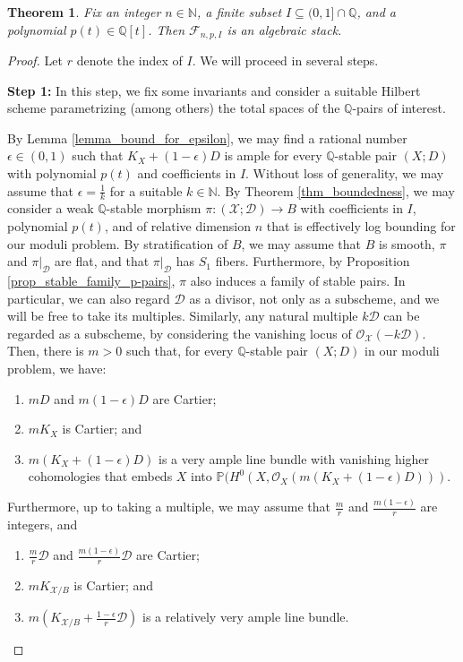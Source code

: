 \documentclass{amsart}
\newcommand{\bP}{\mathbb{P}}
\newcommand{\bQ}{\mathbb{Q}}
\newcommand{\sF}{\mathscr{F}}
\newcommand{\cD}{\mathcal{D}}
\newcommand{\cO}{\mathcal{O}}
\newcommand{\cX}{\mathcal{X}}
\newtheorem{theorem}{Theorem}[section]
\theoremstyle{definition}
\def\O#1.{\mathcal {O}_{#1}}
\newcommand{\nn}{\mathbb{N}}
\begin{document}
\begin{theorem}
Fix an integer $n\in \mathbb{N}$, a finite subset $I\subseteq (0,1] \cap \mathbb{Q}$, and a polynomial $p(t) \in \mathbb{Q}[t]$. Then $\sF_{n,p,I}$ is an algebraic stack.
\end{theorem}

\begin{proof}Let $r$ denote the index of $I$.
We will proceed in several steps.


{\bf Step 1:} In this step, we fix some invariants and consider a suitable Hilbert scheme parametrizing (among others) the total spaces of the $\bQ$-pairs of interest.

By Lemma \ref{lemma_bound_for_epsilon}, we may find a rational number $\epsilon \in (0,1)$ such that $K_X+(1-\epsilon)D$ is ample for every $\bQ$-stable pair $(X;D)$ with polynomial $p(t)$ and coefficients in $I$.
Without loss of generality, we may assume that $\epsilon = \frac{1}{k}$ for a suitable $k \in \nn$.
By Theorem \ref{thm_boundedness}, we may consider
a weak $\bQ$-stable morphism $\pi \colon (\cX;\cD)\to B$
with coefficients in $I$, polynomial $p(t)$, and of relative dimension $n$ that is effectively log bounding for our moduli problem.
By stratification of $B$, we may assume that $B$ is smooth, $\pi$ and $\pi|_{\cD}$ are flat, and that $\pi|_{\cD}$ has $S_1$ fibers.
Furthermore, by Proposition \ref{prop_stable_family_p-pairs}, $\pi$ also induces a family of stable pairs.
In particular, we can also regard $\cD$ as a divisor, not only as a subscheme, and we will be free to take its multiples.
Similarly, any natural multiple $k\cD$ can be regarded as a subscheme, by considering the vanishing locus of $\O \cX.(-k\cD)$.
Then, there is $m>0$ such that, for every $\bQ$-stable pair $(X;D)$ in our moduli problem, we have:
\begin{enumerate}
    \item $mD$ and $m(1-\epsilon)D$ are Cartier;
    \item $mK_X$ is Cartier; and
    \item $m(K_X+(1-\epsilon)D)$ is a very ample line bundle with vanishing higher cohomologies that embeds $X$ into $\bP(H^0(X,\cO_X (m(K_X+(1-\epsilon)D)))$.
\end{enumerate}
Furthermore, up to taking a multiple, we may assume that $\frac{m}{r}$ and $\frac{m(1-\epsilon)}{r}$ are integers, and
\begin{enumerate}
    \item $\frac{m}{r} \cD$ and $\frac{m(1-\epsilon)}{r} \cD$ are Cartier;
    \item $mK_{\cX/B}$ is Cartier; and
    \item $m(K_{\cX/B}+\frac{1-\epsilon}{r}\cD)$ is a relatively very ample line bundle.
\end{enumerate}


\end{proof}
\end{document}

